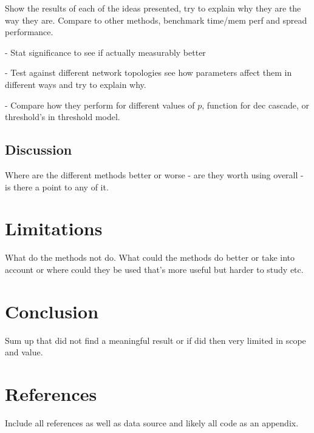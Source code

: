 \documentclass{article}
\begin{document}
Show the results of each of the ideas presented, try to explain why they are the way they are. Compare to other methods, benchmark time/mem perf and spread performance.

- Stat significance to see if actually measurably better 

- Test against different network topologies see how parameters affect them in different ways and try to explain why.

- Compare how they perform for different values of $p$, function for dec cascade, or threshold's in threshold model. 

\subsection{Discussion}
Where are the different methods better or worse - are they worth using overall - is there a point to any of it.

\section{Limitations}
What do the methods not do.
What could the methods do better or take into account or where could they be used that's more useful but harder to study etc.

\section{Conclusion}
Sum up that did not find a meaningful result or if did then very limited in scope and value.

\section{References}
Include all references as well as data source and likely all code as an appendix.
\end{document}
